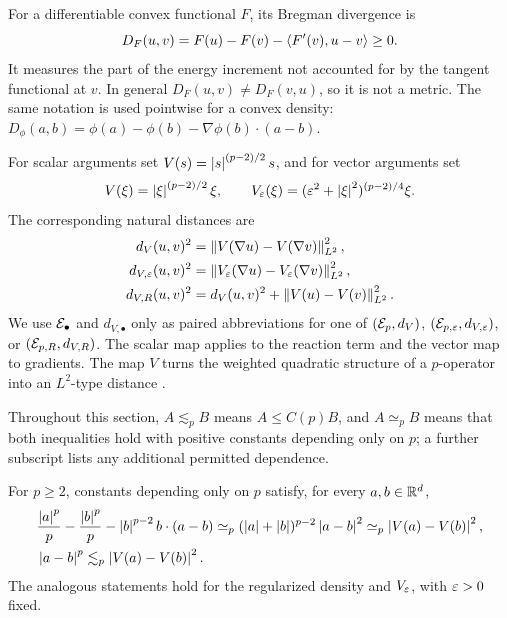 For a differentiable convex functional \(F\), its Bregman divergence is
\begin{equation}
 D_F(u,v)=F(u)-F(v)-\left\langle F'(v),u-v\right\rangle\geq0.
 \label{eq:bregman-definition}
\end{equation}
It measures the part of the energy increment not accounted for by the tangent functional at \(v\). In
general \(D_F(u,v)\neq D_F(v,u)\), so it is not a metric. The same notation is used pointwise for a
convex density: \(D_\phi(a,b)=\phi(a)-\phi(b)-\nabla\phi(b)\cdot(a-b)\).

For scalar arguments set \(V(s)=\left|s\right|^{(p-2)/2}s\), and for vector arguments set
\[
 V(\xi)=\left|\xi\right|^{(p-2)/2}\xi,
 \qquad
 V_\varepsilon(\xi)=(\varepsilon^2+\left|\xi\right|^2)^{(p-2)/4}\xi.
\]
The corresponding natural distances are
\begin{align*}
 d_V(u,v)^2&=\left\lVert V(\nabla u)-V(\nabla v)\right\rVert_{L^2}^2,\\
 d_{V,\varepsilon}(u,v)^2&=\left\lVert V_\varepsilon(\nabla u)-V_\varepsilon(\nabla v)\right\rVert_{L^2}^2,\\
d_{V,R}(u,v)^2&=d_V(u,v)^2+
 \left\lVert V(u)-V(v)\right\rVert_{L^2}^2.
\end{align*}
We use \(\mathcal{E}_\bullet\) and \(d_{V,\bullet}\) only as paired abbreviations for one of
\((\mathcal{E}_p,d_V)\), \((\mathcal{E}_{p,\varepsilon},d_{V,\varepsilon})\), or \((\mathcal{E}_{p,R},d_{V,R})\). The scalar map applies to
the reaction term and the vector map to gradients. The map \(V\) turns the weighted quadratic
structure of a \(p\)-operator into an \(L^2\)-type distance
\citep{BarrettLiu1993,DieningKreuzer2008,LeePark2025}.

Throughout this section, \(A\lesssim_p B\) means \(A\leq C(p)B\), and \(A\simeq_p B\) means that
both inequalities hold with positive constants depending only on \(p\); a further subscript lists
any additional permitted dependence.

\begin{lemma}
\label{lem:pstructure}
For \(p\geq2\), constants depending only on \(p\) satisfy, for every
\(a,b\in\mathbb{R}^d\),
\begin{align}
 &\frac{\left|a\right|^p}{p}-\frac{\left|b\right|^p}{p}
 -\left|b\right|^{p-2}b\cdot(a-b)
 \simeq_p(\left|a\right|+\left|b\right|)^{p-2}\left|a-b\right|^2
 \simeq_p\left|V(a)-V(b)\right|^2,
 \label{eq:pstructure}\\
 &\left|a-b\right|^p\lesssim_p\left|V(a)-V(b)\right|^2.
 \label{eq:pcontrol}
\end{align}
The analogous statements hold for the regularized density and \(V_\varepsilon\), with \(\varepsilon>0\) fixed.
\end{lemma}

